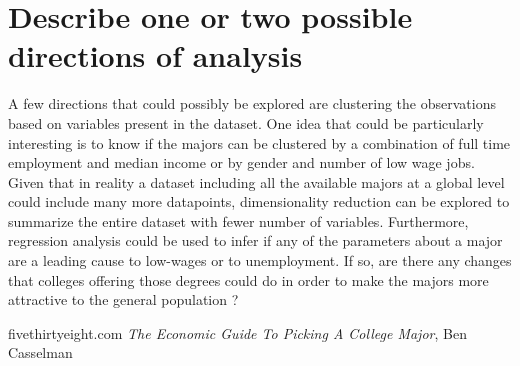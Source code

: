 \documentclass[11pt,a4paper]{report}
\begin{document}
\section*{Describe one or two possible directions of analysis}
A few directions that could possibly be explored are clustering the observations based on variables present in the dataset. One idea that could be particularly interesting is to know if the majors can be clustered by a combination of full time employment and median income or by gender and number of low wage jobs. Given that in reality a dataset including all the available majors at a global level could include many more datapoints, dimensionality reduction can be explored to summarize the entire dataset with fewer number of variables. Furthermore, regression analysis could be used to infer if any of the parameters about a major are a leading cause to low-wages or to unemployment. If so, are there any changes that colleges offering those degrees could do in order to make the majors more attractive to the general population ?

\maketitle
\newpage
\begin{thebibliography}{9}
fivethirtyeight.com \emph{The Economic Guide To Picking A College Major}, Ben Casselman
\end{thebibliography}
\end{document}
